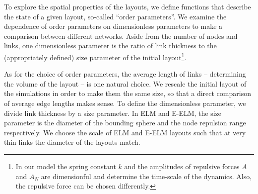 \documentclass[nofootinbib,preprint,floatfix,endfloats]{revtex4} %
\begin{document}

To explore the spatial  %
properties of the layouts, we define functions that describe the state of a given layout, so-called ``order parameters''. 
We examine the dependence of order parameters on dimensionless parameters to make a comparison between different networks. 
Aside from the number of nodes and links, %
one dimensionless parameter is the ratio of link thickness to the (appropriately defined) size parameter of the initial layout\footnote{
In our model the spring constant $k$ and the amplitudes of repulsive forces $A$ and $A_N$ are dimensionful and determine the time-scale of the dynamics.
Also, the repulsive force can be chosen differently. }. 




As for the choice of order parameters, the average length of links -- determining the volume of the layout -- is one natural choice.  
We rescale the initial layout of the simulations in order to make them the same size, so that a direct comparison of average edge lengths makes sense. To define the dimensionless parameter, we divide link thickness by a size parameter. 
In ELM and E-ELM, the size parameter is the diameter of the bounding sphere and the node repulsion range respectively. We choose the scale of ELM and E-ELM layouts such that at very thin links the diameter of the layouts match. 
\end{document}
